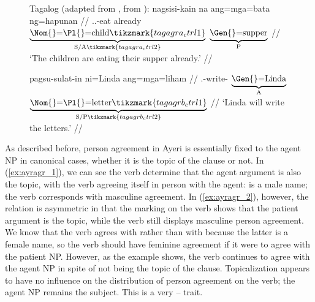 \begin{figure}
\pex\label{ex:tagagr}%
Tagalog (adapted from \cite[24--25]{kroeger1991}, from 
	\cite[122--123]{aspillera1969}):
\a\label{ex:tagagr_1}\begingl[aboveglbskip=1.5em, aboveglftskip=1.75em]
	\gla nagsisi-kain na ang=mga=bata ng=hapunan //
	\glb \Av{}.\Impf{}.\Pl{}-eat already 
		$\underbrace{\text{\Nom{}=\Pl{}=child}\tikzmark{tagagra_ctrl1}}_%
			{\text{S/A}\tikzmark{tagagra_ctrl2}}$
		$\underbrace{\text{\Gen{}=\smash{supper}}}_%
			{\text{P}}$ //
	\glft `The children are eating their supper already.' //
\endgl
{}

\a\label{ex:tagagr_2}\begingl[aboveglbskip=1.5em, aboveglftskip=1.75em]
	\gla pagsu-sulat-in ni=Linda ang=mga=liham //
	\glb \Fut{}.\Pl{}-write-\Ov{}
		$\underbrace{\text{\Gen{}=Linda}}_%
			{\text{A}}$
		$\underbrace{\text{\Nom{}=\Pl{}=letter}\tikzmark{tagagrb_ctrl1}}_%
			{\text{S/P}\tikzmark{tagagrb_ctrl2}}$ //
	\glft `Linda will write the letters.' //
\endgl
{}
\xe
\end{figure}

As described before, person agreement in Ayeri is essentially fixed to the
agent NP in canonical cases, whether it is the topic of the clause or not. In
(\ref{ex:ayragr_1}), we can see the verb determine that the agent argument is
also the topic, with the verb agreeing itself in person with the agent:
 is a male name; the verb corresponds with masculine
agreement. In (\ref{ex:ayragr_2}), however, the relation is asymmetric in that
the marking on the verb shows that the patient argument is the topic, while the
verb still displays masculine person agreement. We know that the verb agrees
with  rather than with  because the latter
is a female name, so the verb should have feminine agreement if it were to
agree with the patient NP. However, as the example shows, the verb continues to
agree with the agent NP in spite of not being the topic of the clause.
Topicalization appears to have no influence on the distribution of person
agreement on the verb; the agent NP remains the subject. This is a very
\Nom{}--\Acc{} trait.

